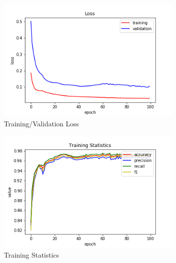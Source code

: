 \begin{figure}[h!]
  \centerfloat
  \begin{subfigure}[b]{0.35\linewidth}
    \includegraphics[width=\linewidth]{images/trained_online_lstm/tile_by_tile_training_block_map_10000_model_loss.png}
     \caption{Training/Validation Loss}
  \end{subfigure}
  \hfill
  \begin{subfigure}[b]{0.35\linewidth}
    \includegraphics[width=\linewidth]{images/trained_online_lstm/tile_by_tile_training_block_map_10000_model_training_stats.png}
     \caption{Training Statistics}
  \end{subfigure}
  \hfill
  \begin{subfigure}[b]{0.35\linewidth}

\end{subfigure}
\end{figure}
